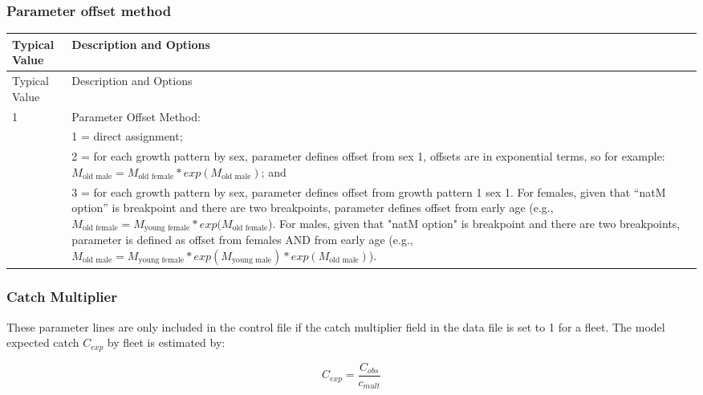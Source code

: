 \pagebreak

\subsubsection{Parameter offset method}

\begin{longtable}{p{0.5cm} p{2cm} p{13cm}}
	\hline	
	\multicolumn{2}{l}{Typical Value} & Description and Options\Tstrut\Bstrut\\
	\hline
	\endfirsthead

	\hline
	\multicolumn{2}{l}{Typical Value} & Description and Options\Tstrut\Bstrut\\
	\hline
	\endhead
	\hline

	\endfoot
	
	\endlastfoot

	 1 & & Parameter Offset Method: \Tstrut\Bstrut\\
	   & & 1 = direct assignment; \\
	   & & 2 = for each growth pattern by sex, parameter defines offset from sex 1, offsets are in exponential terms, so for example: $M_{\text{old male}} = M_{\text{old female}}*exp(M_{\text{old male}})$; and\\
	   & & 3 = for each growth pattern by sex, parameter defines offset from growth pattern 1 sex 1.  For females, given that “natM option” is breakpoint and there are two breakpoints, parameter defines offset from early age (e.g., $M_{\text{old female}} = M_{\text{young female}}*exp(M_{\text{old female}}$). For males, given that "natM option" is breakpoint and there are two breakpoints, parameter is defined as offset from females AND from early age (e.g., $M_{\text{old male}} = M_{\text{young female}}*exp(M_{\text{young male}})*exp(M_{\text{old male}})$).\Bstrut\\
	\hline
\end{longtable}


\subsubsection{Catch Multiplier}
These  parameter lines are only included in the control file if the catch multiplier field in the data file is set to 1 for a fleet. The model expected catch $C_{exp}$ by fleet is estimated by:

\begin{equation}
C_{exp} =  \frac{C_{obs}}{c_{mult}}
\end{equation}

